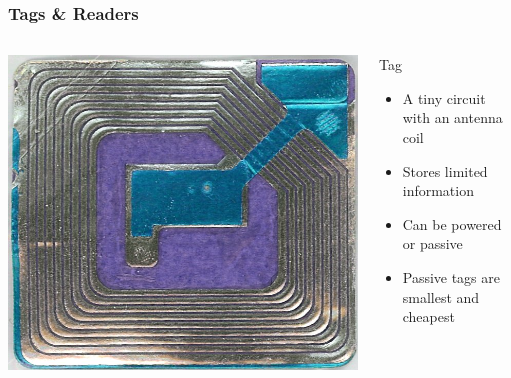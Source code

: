 \documentclass[unknownkeysallowed]{beamer}
\begin{document}
\begin{frame}
\frametitle{Tags \& Readers}

  \begin{columns}[T]
    \begin{column}{.5\textwidth}\centering
        \vspace{3mm}
        \includegraphics[width=\linewidth,height=0.2\textheight,keepaspectratio]{figures/wikimediatagWide.jpg}
    \end{column}
    \begin{column}{.5\textwidth}
        \begin{block}{Tag}
          \begin{itemize}
              \item{A tiny circuit with an antenna coil}
              \item{Stores limited information}
              \item{Can be powered or passive}
              \item{Passive tags are smallest and cheapest}
              \pause
            \end{itemize}
          \end{block}
    \end{column}
  \end{columns}


\end{frame}
\end{document}
